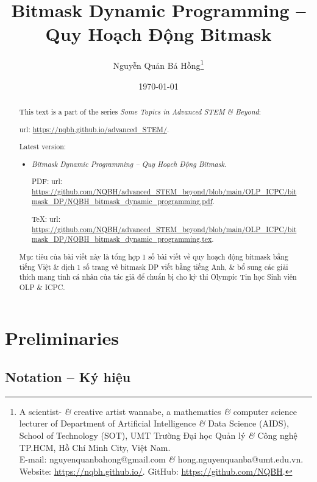 \documentclass{article}
\title{Bitmask Dynamic Programming -- Quy Hoạch Động Bitmask}
\author{Nguyễn Quản Bá Hồng\footnote{A scientist- {\it\&} creative artist wannabe, a mathematics {\it\&} computer science lecturer of Department of Artificial Intelligence {\it\&} Data Science (AIDS), School of Technology (SOT), UMT Trường Đại học Quản lý {\it\&} Công nghệ TP.HCM, Hồ Chí Minh City, Việt Nam.\\E-mail: {\sf nguyenquanbahong@gmail.com} {\it\&} {\sf hong.nguyenquanba@umt.edu.vn}. Website: \url{https://nqbh.github.io/}. GitHub: \url{https://github.com/NQBH}.}}
\date{\today}
\begin{document}
 \maketitle
\begin{abstract}
    This text is a part of the series {\it Some Topics in Advanced STEM \& Beyond}:

    {\sc url}: \url{https://nqbh.github.io/advanced_STEM/}.

    Latest version:
    \begin{itemize}
        \item {\it Bitmask Dynamic Programming -- Quy Hoạch Động Bitmask}.

        PDF: {\sc url}: \url{https://github.com/NQBH/advanced_STEM_beyond/blob/main/OLP_ICPC/bitmask_DP/NQBH_bitmask_dynamic_programming.pdf}.

        \TeX: {\sc url}: \url{https://github.com/NQBH/advanced_STEM_beyond/blob/main/OLP_ICPC/bitmask_DP/NQBH_bitmask_dynamic_programming.tex}.
    \end{itemize}
    Mục tiêu của bài viết này là tổng hợp 1 số bài viết về quy hoạch động bitmask bằng tiếng Việt \& dịch 1 số trang về bitmask DP viết bằng tiếng Anh, \& bổ sung các giải thích mang tính cá nhân của tác giả để chuẩn bị cho kỳ thi Olympic Tin học Sinh viên OLP \& ICPC.
\end{abstract}
\tableofcontents


\section{Preliminaries}


\subsection{Notation -- Ký hiệu}
\end{document}
